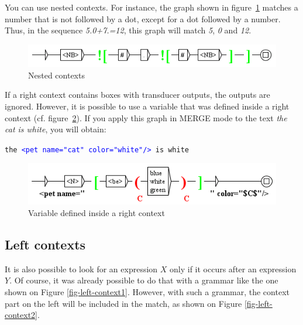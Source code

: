 \bigskip
\noindent You can use nested contexts. For instance, the graph shown in
figure~\ref{fig-context5} matches a number that is not followed by a dot, except
for a dot followed by a number. Thus, in the sequence \textit{5.0+7.=12}, this graph
will match \textit{5}, \textit{0} and \textit{12}.

\bigskip
\begin{figure}[!h]
\begin{center}
\includegraphics[width=12cm]{resources/img/fig6-16.png}
\caption{Nested contexts\label{fig-context5}}
\end{center}
\end{figure}

\bigskip
\noindent If a right context contains boxes with transducer outputs, the
outputs are ignored. However, it is possible to use a variable that was defined inside a
right context (cf. figure~\ref{fig-context6}). If you apply this graph in MERGE
mode to the text \textit{the cat is white}, you will obtain:

\bigskip
\texttt{the \textcolor{blue}{<pet name="cat" color="white"/>} is white}

\bigskip

\begin{figure}[!h]
\begin{center}
\includegraphics[width=12.2cm]{resources/img/fig6-17.png}
\caption{Variable defined inside a right context\label{fig-context6}}
\end{center}
\end{figure}

\subsection{Left contexts}
\index{\verb+$*+}
It is also possible to look for an expression $X$ only if it
occurs after an expression $Y$. Of course, it was already possible to do that with a grammar
like the one shown on Figure \ref{fig-left-context1}. However, with such a
grammar, the context part on the left will be included in the match, as shown on Figure
\ref{fig-left-context2}.

